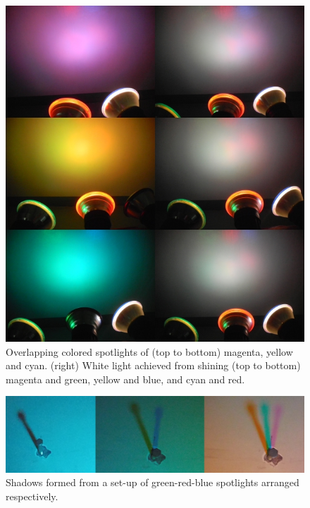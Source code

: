 \documentclass[twoside]{article}
\begin{document}
\captionsetup[figure]{width=5in}
\begin{figure}[h!]
\centering
\includegraphics[scale=0.4]{compli}
\caption{Overlapping colored spotlights of (top to bottom) magenta, yellow and cyan. (right) White light achieved from shining (top to bottom) magenta and green, yellow and blue, and cyan and red.}
\label{fig:phasediff}
\end{figure}

\captionsetup[figure]{width=5in}
\begin{figure}[h!]
\centering
\includegraphics[scale=0.4]{shad}
\caption{Shadows formed from a set-up of green-red-blue spotlights arranged respectively.}
\label{fig:phasediff}
\end{figure}
\end{document}
